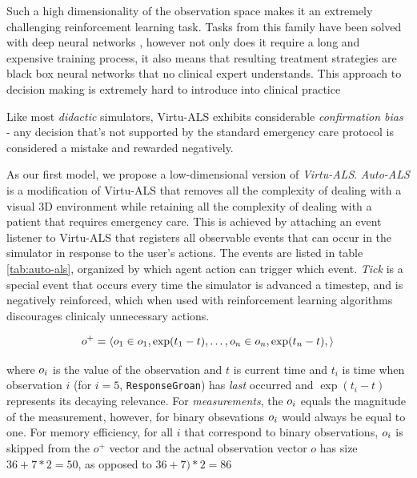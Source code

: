 Such a high dimensionality of the observation space makes it an extremely challenging reinforcement learning task.
Tasks from this family have been solved with deep neural networks \cite{mnihPlayingAtariDeep2013}, however not only does it require a long and expensive training process, it also means that resulting treatment strategies are black box neural networks that no clinical expert understands.
This approach to decision making is extremely hard to introduce into clinical practice \cite{priceBigDataBlackbox2018,watsonClinicalApplicationsMachine2019}

Like most \emph{didactic} simulators, Virtu-ALS exhibits considerable \emph{confirmation bias} - any decision that's not supported by the standard emergency care protocol \cite{thimInitialAssessmentTreatment2012} is considered a mistake and rewarded negatively.

As our first model, we propose a low-dimensional version of \emph{Virtu-ALS}.
\emph{Auto-ALS} is a modification of Virtu-ALS that removes all the complexity of dealing with a visual 3D environment while retaining all the complexity of dealing with a patient that requires emergency care.
This is achieved by attaching an event listener to Virtu-ALS that registers all observable events that can occur in the simulator in response to the user's actions.
The events are listed in table \ref{tab:auto-als}, organized by which agent action can trigger which event.
\emph{Tick} is a special event that occurs every time the simulator is advanced a timestep, and is negatively reinforced, which when used with reinforcement learning algorithms discourages clinicaly unnecessary actions.

\begin{equation}
     o^{+} = \langle o_1 \in o_1, \exp(t_1-t), \dots, o_n \in o_n, \exp(t_n-t), \rangle
\end{equation}

where $o_i$ is the value of the observation and $t$ is current time and $t_i$ is time when observation $i$ (for $i=5$, \verb|ResponseGroan|) has \emph{last} occurred and $\exp(t_i-t)$ represents its decaying relevance.
For \emph{measurements}, the $o_i$ equals the magnitude of the measurement, however, for binary obsevations $o_i$ would always be equal to one.
For memory efficiency, for all $i$ that correspond to binary observations, $o_i$ is skipped from the $o^{+} $ vector and the actual observation vector $o$ has size $36+7*2=50$, as opposed to $36+7)*2=86$

